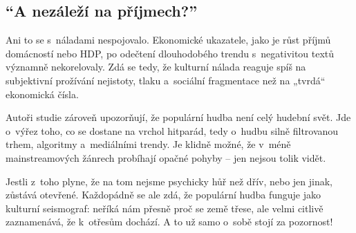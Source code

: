 \documentclass[main.tex]{subfiles}
\begin{document}
\subsection*{\enquote{A nezáleží na příjmech?}}
Ani to se s~náladami nespojovalo. Ekonomické ukazatele, jako je růst příjmů domácností nebo HDP, po odečtení dlouhodobého trendu s~negativitou textů významně nekorelovaly. Zdá se tedy, že kulturní nálada reaguje spíš na subjektivní prožívání nejistoty, tlaku a~sociální fragmentace než na „tvrdá“ ekonomická čísla.\par
Autoři studie zároveň upozorňují, že populární hudba není celý hudební svět. Jde o~výřez toho, co se dostane na vrchol hitparád, tedy o~hudbu silně filtrovanou trhem, algoritmy a~mediálními trendy. Je klidně možné, že v~méně mainstreamových žánrech probíhají opačné pohyby – jen nejsou tolik vidět.\par
Jestli z~toho plyne, že na tom nejsme psychicky hůř než dřív, nebo jen jinak, zůstává otevřené. Každopádně se ale zdá, že populární hudba funguje jako kulturní seismograf: neříká nám přesně proč se země třese, ale velmi citlivě zaznamenává, že k~otřesům dochází. A to už samo o~sobě stojí za pozornost!
\newpage
\end{document}
